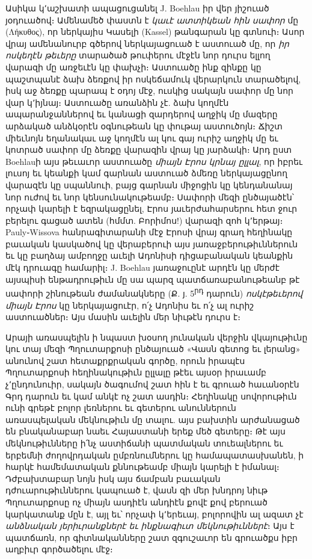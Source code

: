 \documentclass{article}
\begin{document}
{Ասիկա կ՚աշխատի ապացուցանել J. Boehlau իր վեր յիշուած յօդուածով։ Ամենամեծ փաստն է \emph{կաւէ ատտիկեան հին սափոր} մը (Λήκυθος), որ ներկայիս Կասելի (Kassel) թանգարան կը գտնուի։ Ասոր վրայ ամենանուրբ գծերով ներկայացուած է աստուած մը, որ \emph{իր ոսկեղէն թեւերը} տարածած թուփերու մէջէն նոր դուրս ելլող վարազի մը առջեւէն կը փախչի։ Աստուածը ինք զինքը կը պաշտպանէ ձախ ձեռքով իր ոսկեճամուկ վերարկուն տարածելով, իսկ աջ ձեռքը պարապ է օդոյ մէջ, ուսկից սակայն սափոր մը նոր վար կ՚իյնայ։ Աստուածը առանձին չէ. ձախ կողմէն ապարանջաններով եւ կանացի զարդերով աղջիկ մը մազերը արձակած անձկօրէն օգնութեան կը փութայ աստուծոյն։ Ճիշտ միեւնոյն եղանակաւ աջ կողմէն ալ կու գայ ուրիշ աղջիկ մը եւ կոտրած սափոր մը ձեռքը վարազին վրայ կը յարձակի։ Արդ ըստ Boehlauի այս թեւաւոր աստուածը \emph{միայն Էրոս կրնայ ըլլալ}, որ իբրեւ լուսոյ եւ կեանքի կամ գարնան աստուած ձմեռը ներկայացընող վարազէն կը սպաննուի, բայց գարնան միջոցին կը կենդանանայ նոր ուժով եւ նոր կենսունակութեամբ։ Սափորի մեզի ընծայածէն՝ որչափ կարելի է եզրակացընել, Էրոս յաւերժահարսերու հետ ջուր բերելու գացած ատեն (հմմտ. Բորիմոս!) վարազի զոհ կ՚երթայ։ Pauly֊Wissova հանրագիտարանի մէջ Էրոսի վրայ գրաղ հեղինակը բաւական կասկածով կը վերաբերուի այս յառաջբերութիւններուն եւ կը բաղձայ ամբողջը աւելի Ադոնիսի դիցաբանական կեանքին մէկ դրուագը համարիլ։ J. Boehlau յառաջուընէ արդէն կը մերժէ այսպիսի ենթադրութիւն մը սա պարզ պատճառաբանութեանբ թէ սափորի շինութեան ժամանակները (Ք. յ. 5\textsuperscript{րդ} դարուն) \emph{ոսկէթեւերով միայն Էրոս} կը ներկայացուէր, ո՛չ Ադոնիս եւ ո՛չ ալ ուրիշ աստուածներ։ Այս մասին աւելին մեր նիւթէն դուրս է։

Արայի առասպելին ի նպաստ խօսող յունական վերջին վկայութիւնը կու տայ մեզի Պղուտարքոսի ընծայուած «Վասն գետոց եւ լերանց» անունով շատ հետաքրքրական գործը, որուն իրապէս Պղուտարքոսի հեղինակութիւն ըլլալը թէեւ այսօր իրաւամբ չ՚ընդունուիր, սակայն ծագումով շատ հին է եւ գրուած հաւանօրէն Գրդ դարուն եւ կամ անկէ ոչ շատ ասդին։ Հեղինակը սովորութիւն ունի գրեթէ բոլոր լեռներու եւ գետերու անուններուն առասպելական մեկնութիւն մը տալու. այս բախտին արժանացած են բնականաբար նաեւ Հայաստանի երեք մեծ գետերը։ Թէ այս մեկնութիւնները ի՛նչ աստիճանի պատմական տուեալներու եւ երբեմնի ժողովրդական ըմբռնումներու կը համապատասխանեն, ի հարկէ համեմատական քննութեամբ միայն կարելի է իմանալ։ Դժբախտաբար նոյն իսկ այս ճամբան բաւական դժուարութիւններու կապուած է, վասն զի մեր խնդրոյ նիւթ Պղուտարքոսը ոչ միայն ասդիէն անդիէն քովէ քով բերուած կարկատանք մըն է, այլ եւ՝ որչափ կ՚երեւայ, բոլորովին ալ ազատ չէ \emph{անձնական յերիւրանքներէ եւ ինքնագիւտ մեկնութիւններէ}։ Այս է պատճառն, որ գիտնականները շատ զգուշաւոր են գրուածքս իբր աղբիւր գործածելու մէջ։

}
\end{document}
